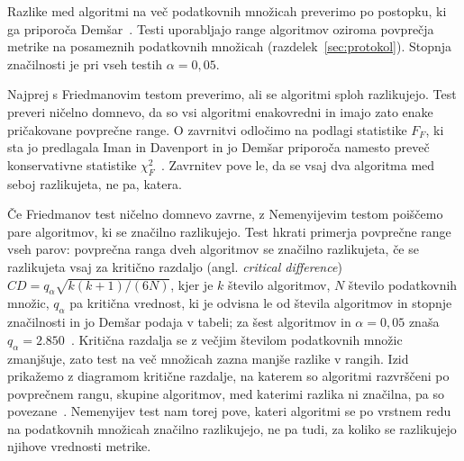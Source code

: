 \documentclass[a4paper,12pt,openright]{book}
\begin{document}

Razlike med algoritmi na več podatkovnih množicah preverimo po postopku, ki ga
priporoča Demšar~\cite{demsar2006statistical}. Testi uporabljajo range
algoritmov oziroma povprečja metrike na posameznih podatkovnih množicah
(razdelek~\ref{sec:protokol}). Stopnja značilnosti je pri vseh testih
$\alpha = 0{,}05$.

Najprej s Friedmanovim testom preverimo, ali se algoritmi sploh razlikujejo.
Test preveri ničelno domnevo, da so vsi algoritmi enakovredni in imajo zato
enake pričakovane povprečne range. O zavrnitvi odločimo na podlagi statistike
$F_F$, ki sta jo predlagala Iman in Davenport in jo Demšar priporoča namesto
preveč konservativne statistike $\chi^2_F$~\cite{demsar2006statistical}.
Zavrnitev pove le, da se vsaj dva algoritma med seboj razlikujeta, ne pa,
katera.

Če Friedmanov test ničelno domnevo zavrne, z Nemenyijevim testom poiščemo
pare algoritmov, ki se značilno razlikujejo. Test hkrati primerja povprečne
range vseh parov: povprečna ranga dveh algoritmov se značilno razlikujeta, če
se razlikujeta vsaj za kritično razdaljo (angl. \emph{critical difference})
$\mathit{CD} = q_\alpha \sqrt{k(k+1)/(6N)}$, kjer je $k$ število algoritmov,
$N$ število podatkovnih množic, $q_\alpha$ pa kritična vrednost, ki je odvisna
le od števila algoritmov in stopnje značilnosti in jo Demšar podaja v tabeli;
za šest algoritmov in $\alpha = 0{,}05$ znaša
$q_\alpha = \num{2.850}$~\cite{demsar2006statistical}. Kritična razdalja se z
večjim številom podatkovnih množic zmanjšuje, zato test na več množicah zazna
manjše razlike v rangih. Izid prikažemo z diagramom kritične razdalje, na
katerem so algoritmi razvrščeni po povprečnem rangu, skupine algoritmov, med
katerimi razlika ni značilna, pa so povezane~\cite{demsar2006statistical}.
Nemenyijev test nam torej pove, kateri algoritmi se po vrstnem redu na
podatkovnih množicah značilno razlikujejo, ne pa tudi, za koliko se
razlikujejo njihove vrednosti metrike.
\end{document}
